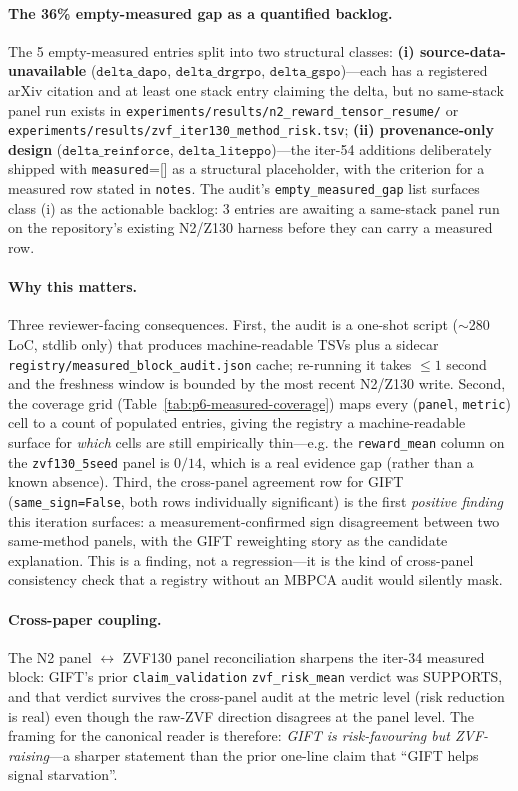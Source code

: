 \documentclass{article}
\providecommand{\tableref}[1]{Table~\ref{#1}}
\begin{document}
\paragraph{The 36\% empty-measured gap as a quantified backlog.}
The 5 empty-measured entries split into two structural classes:
\textbf{(i) source-data-unavailable} ($\texttt{delta\_dapo}$,
$\texttt{delta\_drgrpo}$, $\texttt{delta\_gspo}$)---each has a
registered arXiv citation and at least one stack entry claiming the
delta, but no same-stack panel run exists in
\texttt{experiments/results/n2\_reward\_tensor\_resume/} or
\texttt{experiments/results/zvf\_iter130\_method\_risk.tsv};
\textbf{(ii) provenance-only design} ($\texttt{delta\_reinforce}$,
$\texttt{delta\_liteppo}$)---the iter-54 additions deliberately
shipped with \texttt{measured}=[] as a structural placeholder, with
the criterion for a measured row stated in \texttt{notes}. The
audit's \texttt{empty\_measured\_gap} list surfaces class (i) as
the actionable backlog: 3 entries are awaiting a same-stack panel run
on the repository's existing N2/Z130 harness before they can carry a
measured row.

\paragraph{Why this matters.} Three reviewer-facing consequences.
First, the audit is a one-shot script ($\sim$280\,LoC, stdlib only)
that produces machine-readable TSVs plus a sidecar
\texttt{registry/measured\_block\_audit.json} cache; re-running it
takes $\leq 1$ second and the freshness window is bounded by the most
recent N2/Z130 write. Second, the coverage grid
(\tableref{tab:p6-measured-coverage}) maps every (\texttt{panel},
\texttt{metric}) cell to a count of populated entries, giving the
registry a machine-readable surface for \emph{which} cells are still
empirically thin---e.g. the \texttt{reward\_mean} column on the
\texttt{zvf130\_5seed} panel is $0/14$, which is a real evidence gap
(rather than a known absence). Third, the cross-panel agreement row
for GIFT (\texttt{same\_sign=False}, both rows individually significant)
is the first \emph{positive finding} this iteration surfaces: a
measurement-confirmed sign disagreement between two same-method
panels, with the GIFT reweighting story as the candidate
explanation. This is a finding, not a regression---it is the kind
of cross-panel consistency check that a registry without an MBPCA
audit would silently mask.

\paragraph{Cross-paper coupling.}
The N2 panel ${}\leftrightarrow{}$ ZVF130 panel reconciliation
sharpens the iter-34 measured block: GIFT's prior
\texttt{claim\_validation} \texttt{zvf\_risk\_mean} verdict was
SUPPORTS, and that verdict survives the cross-panel audit at the
metric level (risk reduction is real) even though the raw-ZVF
direction disagrees at the panel level. The framing for the
canonical reader is therefore: \emph{GIFT is risk-favouring but
ZVF-raising}---a sharper statement than the prior one-line claim
that ``GIFT helps signal starvation''.
\end{document}
